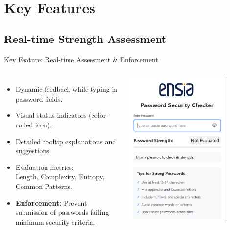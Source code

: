 \documentclass[aspectratio=169]{beamer}
\begin{document}
\section{Key Features}

\subsection{Real-time Strength Assessment}
\begin{frame}{Key Feature: Real-time Assessment \& Enforcement}
  \begin{columns}
    \begin{itemize}
      \item Dynamic feedback while typing in password fields.
      \item Visual status indicators (color-coded icon).
      \item Detailed tooltip explanations and suggestions.
      \item Evaluation metrics:\\ Length, Complexity, Entropy, Common Patterns.
      \item \textbf{Enforcement:} Prevent submission of passwords failing minimum security criteria.
    \end{itemize}
    \centering
    \includegraphics[width=0.8\textwidth]{type.png}
  \end{columns}
\end{frame}
\end{document}
